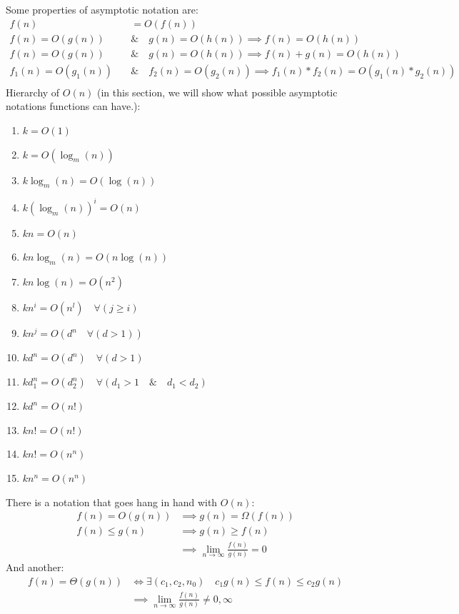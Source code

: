 \documentclass[nobib]{tufte-handout}
\begin{document}
Some properties of asymptotic notation are:
\begin{align*}
    f(n)&=O(f(n))\\
    f(n)=O(g(n))\quad &\& \quad g(n) = O(h(n)) \implies f(n)=O(h(n))\\
    f(n)=O(g(n))\quad &\& \quad g(n) = O(h(n)) \implies f(n)+g(n)=O(h(n))\\
    f_1(n)=O(g_1(n))\quad &\& \quad f_2(n) = O(g_2(n)) \implies f_1(n)*f_2(n)=O(g_1(n)*g_2(n))\\
\end{align*}
Hierarchy of $O(n)$ (in this section, we will show what possible asymptotic notations functions can have.):\\
\begin{enumerate}
    \item $k=O(1)$
    \item $k=O(\log_m(n))$
    \item $k\log_m(n)=O(\log(n))$
    \item $k{(\log_m(n))}^i=O(n)$
    \item $kn=O(n)$
    \item $kn\log_m(n)=O(n\log(n))$
    \item $kn\log(n)=O(n^2)$
    \item $kn^i=O(n^l) \quad \forall (j\geq i)$
    \item $kn^j=O(d^n \quad \forall(d>1))$
    \item $kd^n=O(d^n)\quad \forall (d>1)$
    \item $kd_1^n=O(d_2^n) \quad \forall(d_1>1\quad \&\quad d_1<d_2)$
    \item $kd^n = O(n!)$
    \item $kn!=O(n!)$
    \item $kn!=O(n^n)$
    \item $kn^n=O(n^n)$
\end{enumerate}
There is a notation that goes hang in hand with $O(n)$:
\begin{align*}
    f(n)=O(g(n))&\implies g(n)=\Omega(f(n))\\
    f(n)\leq g(n) &\implies g(n)\geq f(n)\\
    &\implies \lim_{n\rightarrow\infty}\frac{f(n)}{g(n)}=0
\end{align*}
And another:
\begin{align*}
    f(n)=\Theta(g(n)) &\iff \exists(c_1,c_2,n_0)\quad c_1g(n)\leq f(n)\leq c_2g(n)\\
    &\implies \lim_{n\rightarrow\infty}\frac{f(n)}{g(n)}\neq 0,\infty
\end{align*}
\end{document}

